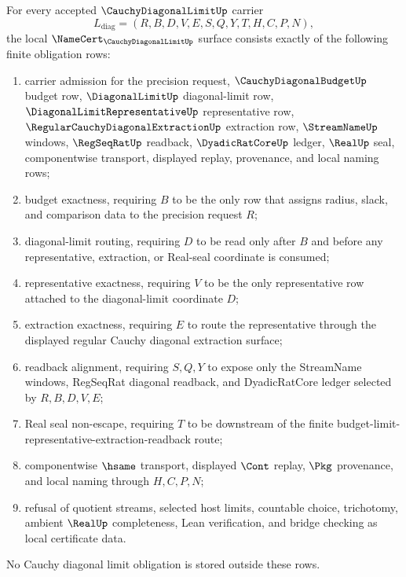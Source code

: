 \begin{theorem}
\label{thm:cauchy-diagonal-limit-namecert-obligations}
For every accepted $\CauchyDiagonalLimitUp$ carrier
$$
L_{\mathrm{diag}}=(R,B,D,V,E,S,Q,Y,T,H,C,P,N),
$$
the local $\NameCert_{\CauchyDiagonalLimitUp}$ surface consists exactly of the following finite obligation rows:
\begin{enumerate}
\item carrier admission for the precision request, $\CauchyDiagonalBudgetUp$ budget row, $\DiagonalLimitUp$ diagonal-limit row, $\DiagonalLimitRepresentativeUp$ representative row, $\RegularCauchyDiagonalExtractionUp$ extraction row, $\StreamNameUp$ windows, $\RegSeqRatUp$ readback, $\DyadicRatCoreUp$ ledger, $\RealUp$ seal, componentwise transport, displayed replay, provenance, and local naming rows;
\item budget exactness, requiring $B$ to be the only row that assigns radius, slack, and comparison data to the precision request $R$;
\item diagonal-limit routing, requiring $D$ to be read only after $B$ and before any representative, extraction, or Real-seal coordinate is consumed;
\item representative exactness, requiring $V$ to be the only representative row attached to the diagonal-limit coordinate $D$;
\item extraction exactness, requiring $E$ to route the representative through the displayed regular Cauchy diagonal extraction surface;
\item readback alignment, requiring $S,Q,Y$ to expose only the StreamName windows, RegSeqRat diagonal readback, and DyadicRatCore ledger selected by $R,B,D,V,E$;
\item Real seal non-escape, requiring $T$ to be downstream of the finite budget-limit-representative-extraction-readback route;
\item componentwise $\hsame$ transport, displayed $\Cont$ replay, $\Pkg$ provenance, and local naming through $H,C,P,N$;
\item refusal of quotient streams, selected host limits, countable choice, trichotomy, ambient $\RealUp$ completeness, Lean verification, and bridge checking as local certificate data.
\end{enumerate}
No Cauchy diagonal limit obligation is stored outside these rows.
\end{theorem}
